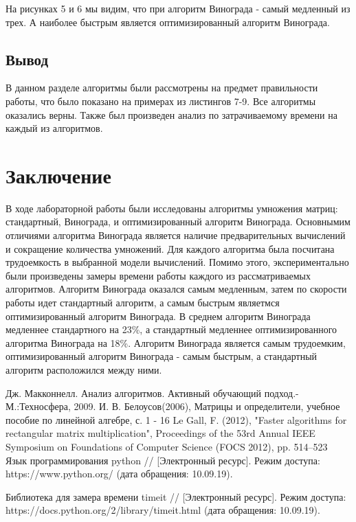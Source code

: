 \documentclass[a4paper, 14pt]{article}
\begin{document}
       	
    На рисунках 5 и 6 мы видим, что при алгоритм Винограда - самый медленный из трех. А наиболее быстрым является оптимизированный алгоритм Винограда.
	\subsection{Вывод}
	В данном разделе алгоритмы были рассмотрены на предмет правильности работы, что было показано на примерах из листингов 7-9. Все алгоритмы оказались верны. Также был произведен анализ по затрачиваемому времени на каждый из алгоритмов.
		

    	\newpage
        \section*{Заключение}
        
        В ходе лабораторной работы были исследованы алгоритмы умножения матриц: стандартный, Винограда, и оптимизированный алгоритм Винограда. Основнымим отличиями алгоритма Винограда является наличие предварительных вычислений и сокращение количества умножений. Для каждого алгоритма была посчитана трудоемкость в выбранной модели вычислений. Помимо этого, экспериментально были произведены замеры времени работы каждого из рассматриваемых алгоритмов. Алгоритм Винограда оказался самым медленным, затем по скорости работы идет стандартный алгоритм, а самым быстрым являетмся оптимизированный алгоритм Винограда. В среднем алгоритм Винограда медленнее стандартного на 23\%, а стандартный медленнее оптимизированного алгоритма Винограда на 18\%. Алгоритм Винограда является самым трудоемким, оптимизированный алгоритм Винограда - самым быстрым, а стандартный алгоритм расположился между ними.
        


    \begin{center}
    	\newpage
        
        \begin{thebibliography}{}
      Дж. Макконнелл. Анализ алгоритмов. Активный обучающий подход.-М.:Техносфера, 2009.
     И. В. Белоусов(2006), Матрицы и определители, учебное пособие по линейной алгебре, с. 1 - 16
	 Le Gall, F. (2012), "Faster algorithms for rectangular matrix multiplication", Proceedings of the 53rd Annual IEEE Symposium on Foundations of Computer Science (FOCS 2012), pp. 514–523
	 Язык программирования python // [Электронный ресурс]. Режим
доступа: https://www.python.org/ (дата обращения: 10.09.19).

	 Библиотека для замера времени timeit // [Электронный ресурс]. Режим
доступа: https://docs.python.org/2/library/timeit.html (дата обращения: 10.09.19).
\end{thebibliography}

	
	
	
	
        
    \end{center}        
\end{document}
